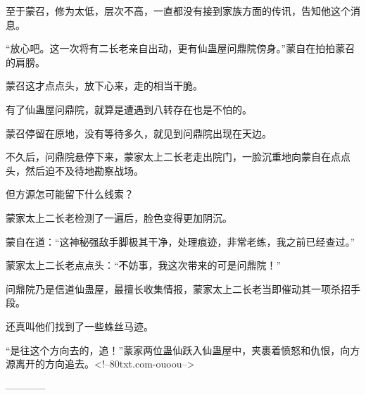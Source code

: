 \begin{this_body}
至于蒙召，修为太低，层次不高，一直都没有接到家族方面的传讯，告知他这个消息。

“放心吧。这一次将有二长老亲自出动，更有仙蛊屋问鼎院傍身。”蒙自在拍拍蒙召的肩膀。

蒙召这才点点头，放下心来，走的相当干脆。

有了仙蛊屋问鼎院，就算是遭遇到八转存在也是不怕的。

蒙召停留在原地，没有等待多久，就见到问鼎院出现在天边。

不久后，问鼎院悬停下来，蒙家太上二长老走出院门，一脸沉重地向蒙自在点点头，然后迫不及待地勘察战场。

但方源怎可能留下什么线索？

蒙家太上二长老检测了一遍后，脸色变得更加阴沉。

蒙自在道：“这神秘强敌手脚极其干净，处理痕迹，非常老练，我之前已经查过。”

蒙家太上二长老点点头：“不妨事，我这次带来的可是问鼎院！”

问鼎院乃是信道仙蛊屋，最擅长收集情报，蒙家太上二长老当即催动其一项杀招手段。

还真叫他们找到了一些蛛丝马迹。

“是往这个方向去的，追！”蒙家两位蛊仙跃入仙蛊屋中，夹裹着愤怒和仇恨，向方源离开的方向追去。<!--80txt.com-ouoou-->

------------

\end{this_body}

